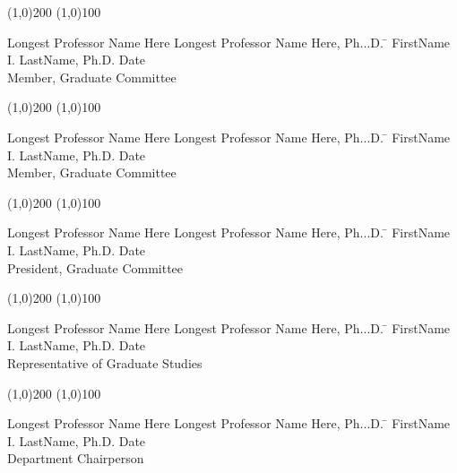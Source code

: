   \noindent
\line(1,0){200} \hspace{40 mm} \line(1,0){100}\\
  \noindent
\vspace{-1.75\baselineskip}
  \begin{tabbing}
Longest Professor Name Here Longest Professor Name Here, Ph...D. \=  \kill 
FirstName I. LastName, Ph.D. \>  Date\\Member, Graduate Committee  %
\end{tabbing}



  \noindent
\line(1,0){200} \hspace{40 mm} \line(1,0){100}\\
  \noindent
\vspace{-1.75\baselineskip}
  \begin{tabbing}
Longest Professor Name Here Longest Professor Name Here, Ph...D. \=  \kill 
FirstName I. LastName, Ph.D. \>  Date\\Member, Graduate Committee  %
\end{tabbing}


  \noindent
\line(1,0){200} \hspace{40 mm} \line(1,0){100}\\
  \noindent
\vspace{-1.75\baselineskip}
  \begin{tabbing}
Longest Professor Name Here Longest Professor Name Here, Ph...D.   \=  \kill 
FirstName I. LastName, Ph.D. \>  Date\\President, Graduate Committee %
\end{tabbing}



  \noindent
\line(1,0){200} \hspace{40 mm} \line(1,0){100}\\
  \noindent
\vspace{-1.75\baselineskip}
  \begin{tabbing}
Longest Professor Name Here Longest Professor Name Here, Ph...D.  \=  \kill 
FirstName I. LastName, Ph.D. \>  Date\\Representative of Graduate Studies  %
\end{tabbing}


  \noindent
  \line(1,0){200} \hspace{40 mm} \line(1,0){100}\\
  \noindent
\vspace{-1.75\baselineskip}
  \begin{tabbing}
Longest Professor Name Here Longest Professor Name Here, Ph...D.  \=  \kill 
FirstName I. LastName, Ph.D. \>  Date\\Department Chairperson  %
\end{tabbing}